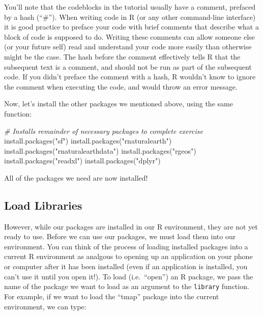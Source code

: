 \documentclass[
]{article}
\newenvironment{Shaded}{\begin{snugshade}}{\end{snugshade}}
\newcommand{\CommentTok}[1]{\textcolor[rgb]{0.56,0.35,0.01}{\textit{#1}}}
\newcommand{\FunctionTok}[1]{\textcolor[rgb]{0.00,0.00,0.00}{#1}}
\newcommand{\NormalTok}[1]{#1}
\newcommand{\StringTok}[1]{\textcolor[rgb]{0.31,0.60,0.02}{#1}}
\begin{document}
You'll note that the codeblocks in the tutorial usually have a comment, prefaced by a hash (``\#''). When writing code in R (or any other command-line interface) it is good practice to preface your code with brief comments that describe what a block of code is supposed to do. Writing these comments can allow someone else (or your future self) read and understand your code more easily than otherwise might be the case. The hash before the comment effectively tells R that the subsequent text is a comment, and should not be run as part of the subsequent code. If you didn't preface the comment with a hash, R wouldn't know to ignore the comment when executing the code, and would throw an error message.

Now, let's install the other packages we mentioned above, using the same function:

\begin{Shaded}
\begin{Highlighting}[]
\CommentTok{\# Installs remainder of necessary packages to complete exercise}
\FunctionTok{install.packages}\NormalTok{(}\StringTok{"sf"}\NormalTok{)}
\FunctionTok{install.packages}\NormalTok{(}\StringTok{"rnaturalearth"}\NormalTok{)}
\FunctionTok{install.packages}\NormalTok{(}\StringTok{"rnaturalearthdata"}\NormalTok{)}
\FunctionTok{install.packages}\NormalTok{(}\StringTok{"rgeos"}\NormalTok{)}
\FunctionTok{install.packages}\NormalTok{(}\StringTok{"readxl"}\NormalTok{)}
\FunctionTok{install.packages}\NormalTok{(}\StringTok{"dplyr"}\NormalTok{)}
\end{Highlighting}
\end{Shaded}

All of the packages we need are now installed!

\hypertarget{load-libraries}{%
\subsection{Load Libraries}\label{load-libraries}}

However, while our packages are installed in our R environment, they are not yet ready to use. Before we can use our packages, we must load them into our environment. You can think of the process of loading installed packages into a current R environment as analgous to opening up an application on your phone or computer after it has been installed (even if an application is installed, you can't use it until you open it!). To load (i.e.~``open'') an R package, we pass the name of the package we want to load as an argument to the \texttt{library} function. For example, if we want to load the ``tmap'' package into the current environment, we can type:
\end{document}
